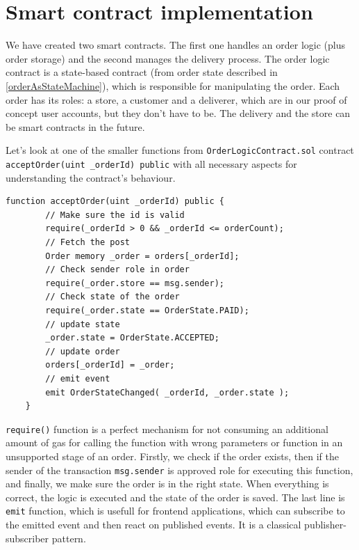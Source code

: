 \documentclass[thesis=M,english]{FITthesis}[2019/12/23]
\begin{document}
\section{Smart contract implementation}
We have created two smart contracts. The first one handles an order logic (plus order storage) and the second manages the delivery process. The order logic contract is a state-based contract (from order state described in \ref{orderAsStateMachine}), which is responsible for manipulating the order. Each order has its roles: a store, a customer and a deliverer, which are in our proof of concept user accounts, but they don't have to be. The delivery and the store can be smart contracts in the future.

Let's look at one of the smaller functions from \texttt{OrderLogicContract.sol} contract \texttt{acceptOrder(uint \_orderId) public} with all necessary aspects for understanding the contract's behaviour.

\begin{lstlisting}[caption=OrderLogicContract.sol function example]
    function acceptOrder(uint _orderId) public {
        // Make sure the id is valid
        require(_orderId > 0 && _orderId <= orderCount);
        // Fetch the post
        Order memory _order = orders[_orderId];
        // Check sender role in order
        require(_order.store == msg.sender);
        // Check state of the order
        require(_order.state == OrderState.PAID);
        // update state
        _order.state = OrderState.ACCEPTED;
        // update order
        orders[_orderId] = _order;
        // emit event
        emit OrderStateChanged( _orderId, _order.state );
    }
\end{lstlisting}

\texttt{require()} function is a perfect mechanism for not consuming an additional amount of gas for calling the function with wrong parameters or function in an unsupported stage of an order. Firstly, we check if the order exists, then if the sender of the transaction \texttt{msg.sender} is approved role for executing this function, and finally, we make sure the order is in the right state. When everything is correct, the logic is executed and the state of the order is saved. The last line is \texttt{emit} function, which is usefull for frontend applications, which can subscribe to the emitted event and then react on published events. It is a classical publisher-subscriber pattern.
\end{document}
